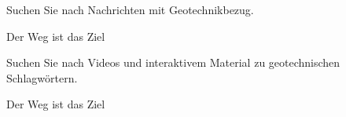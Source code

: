 Suchen Sie nach Nachrichten mit Geotechnikbezug.

\begin{solution}
Der Weg ist das Ziel 
\end{solution}


Suchen Sie nach Videos und interaktivem Material zu geotechnischen Schlagwörtern.

\begin{solution}
Der Weg ist das Ziel 
\end{solution}
